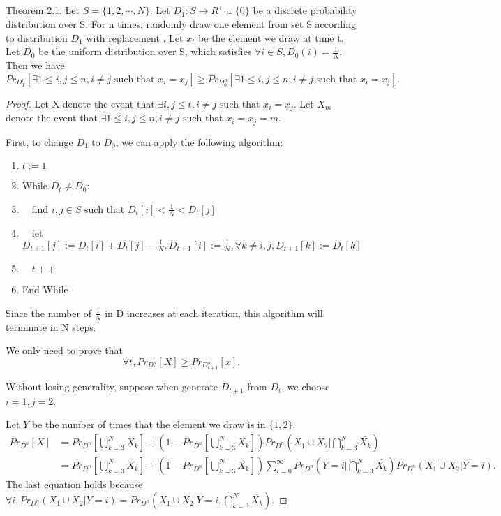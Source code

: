 \documentclass{article}
\begin{document}
\begin{spacing}{1.1}
    \section{}
    Theorem 2.1. Let $S = \{1, 2, \cdots, N\}$. Let $D_1: S\to R^+\cup \{0\}$ be a discrete probability distribution over S. For n times, randomly draw one element from set S according to distribution $D_1$ with replacement . Let $x_t$ be the element we draw at time t. Let $D_0$ be the uniform distribution over S, which satisfies $\forall i \in S, D_0(i) = \frac{1}{N}$. Then we have
    $$Pr_{D_1^n}[\exists 1\leq i, j \leq n, i\not = j \text{ such that } x_i = x_j] \geq Pr_{D_0^n}[\exists 1\leq i, j \leq n, i\not = j \text{ such that } x_i = x_j].$$
    \begin{proof}
        Let X denote the event that $\exists i, j \leq t, i\not = j \text{ such that } x_i = x_j$. Let $X_m$ denote the event that $\exists 1\leq i, j \leq n, i\not = j \text{ such that } x_i = x_j = m$.

        First, to change $D_1$ to $D_0$, we can apply the following algorithm:
        \begin{enumerate}
            \item $t := 1$
            \item While $D_t \not = D_0$:
            \item $\quad$find $i, j \in S$ such that $D_t[i] < \frac{1}{N} < D_t[j]$
            \item $\quad$let $D_{t+1}[j] := D_t[i] + D_t[j] - \frac{1}{N}, D_{t+1}[i] := \frac{1}{N}, \forall k \not = i, j, D_{t+1}[k] := D_t[k]$
            \item $\quad t++$
            \item End While
        \end{enumerate}
        Since the number of $\frac{1}{N}$ in D increases at each iteration, this algorithm will terminate in N steps.

        We only need to prove that $$\forall t, Pr_{D_t^n}[X] \geq Pr_{D_{t+1}^n}[x].$$

        Without losing generality, suppose when generate $D_{t+1}$ from $D_t$, we choose $i = 1, j = 2$.

        Let $Y$ be the number of times that the element we draw is in $\{1, 2\}$.
        \begin{equation}
            \begin{aligned}
                Pr_{D^n}[X] &= Pr_{D^n}[\bigcup_{k = 3}^N X_k] + (1 - Pr_{D^n}[\bigcup_{k = 3}^N X_k])Pr_{D^n}(X_1\cup X_2 | \bigcap_{k = 3}^N \bar{X_k})\\
                &= Pr_{D^n}[\bigcup_{k = 3}^N X_k] + (1 - Pr_{D^n}[\bigcup_{k = 3}^N X_k])\sum_{i=0}^\infty Pr_{D^n}(Y = i | \bigcap_{k = 3}^N \bar{X_k}) Pr_{D^n}(X_1\cup X_2 | Y = i).
            \end{aligned}
        \end{equation}
        The last equation holds because $\forall i, Pr_{D^n}(X_1\cup X_2 | Y = i) = Pr_{D^n}(X_1\cup X_2 | Y = i, \bigcap_{k = 3}^N \bar{X_k})$.


\end{proof}
\end{spacing}
\end{document}

